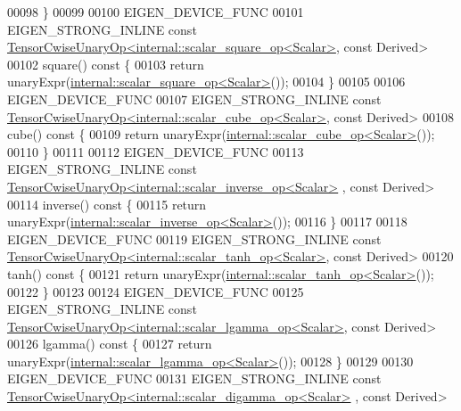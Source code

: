 \begin{DoxyCode}
00098     \}
00099 
00100     EIGEN\_DEVICE\_FUNC
00101     EIGEN\_STRONG\_INLINE \textcolor{keyword}{const} 
      \hyperlink{class_eigen_1_1_tensor_cwise_unary_op}{TensorCwiseUnaryOp<internal::scalar\_square\_op<Scalar>},
       \textcolor{keyword}{const} Derived>
00102     square()\textcolor{keyword}{ const }\{
00103       \textcolor{keywordflow}{return} unaryExpr(\hyperlink{struct_eigen_1_1internal_1_1scalar__square__op}{internal::scalar\_square\_op<Scalar>}());
00104     \}
00105 
00106     EIGEN\_DEVICE\_FUNC
00107     EIGEN\_STRONG\_INLINE \textcolor{keyword}{const} 
      \hyperlink{class_eigen_1_1_tensor_cwise_unary_op}{TensorCwiseUnaryOp<internal::scalar\_cube\_op<Scalar>}, \textcolor{keyword}{
      const} Derived>
00108     cube()\textcolor{keyword}{ const }\{
00109       \textcolor{keywordflow}{return} unaryExpr(\hyperlink{struct_eigen_1_1internal_1_1scalar__cube__op}{internal::scalar\_cube\_op<Scalar>}());
00110     \}
00111 
00112     EIGEN\_DEVICE\_FUNC
00113     EIGEN\_STRONG\_INLINE \textcolor{keyword}{const} 
      \hyperlink{class_eigen_1_1_tensor_cwise_unary_op}{TensorCwiseUnaryOp<internal::scalar\_inverse\_op<Scalar>}
      , \textcolor{keyword}{const} Derived>
00114     inverse()\textcolor{keyword}{ const }\{
00115       \textcolor{keywordflow}{return} unaryExpr(\hyperlink{struct_eigen_1_1internal_1_1scalar__inverse__op}{internal::scalar\_inverse\_op<Scalar>}());
00116     \}
00117 
00118     EIGEN\_DEVICE\_FUNC
00119     EIGEN\_STRONG\_INLINE \textcolor{keyword}{const} 
      \hyperlink{class_eigen_1_1_tensor_cwise_unary_op}{TensorCwiseUnaryOp<internal::scalar\_tanh\_op<Scalar>}, \textcolor{keyword}{
      const} Derived>
00120     tanh()\textcolor{keyword}{ const }\{
00121       \textcolor{keywordflow}{return} unaryExpr(\hyperlink{struct_eigen_1_1internal_1_1scalar__tanh__op}{internal::scalar\_tanh\_op<Scalar>}());
00122     \}
00123 
00124     EIGEN\_DEVICE\_FUNC
00125     EIGEN\_STRONG\_INLINE \textcolor{keyword}{const} 
      \hyperlink{class_eigen_1_1_tensor_cwise_unary_op}{TensorCwiseUnaryOp<internal::scalar\_lgamma\_op<Scalar>},
       \textcolor{keyword}{const} Derived>
00126     lgamma()\textcolor{keyword}{ const }\{
00127       \textcolor{keywordflow}{return} unaryExpr(\hyperlink{struct_eigen_1_1internal_1_1scalar__lgamma__op}{internal::scalar\_lgamma\_op<Scalar>}());
00128     \}
00129 
00130     EIGEN\_DEVICE\_FUNC
00131     EIGEN\_STRONG\_INLINE \textcolor{keyword}{const} 
      \hyperlink{class_eigen_1_1_tensor_cwise_unary_op}{TensorCwiseUnaryOp<internal::scalar\_digamma\_op<Scalar>}
      , \textcolor{keyword}{const} Derived>

\end{DoxyCode}
